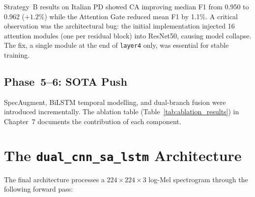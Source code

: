 \documentclass[oneside,openany]{final_report}
\begin{document}
Strategy~B results on Italian PD showed CA improving median F1 from 0.950 to 0.962 ($+1.2\%$) while the Attention Gate reduced mean F1 by 1.1\%. A critical observation was the architectural bug: the initial implementation injected 16 attention modules (one per residual block) into ResNet50, causing model collapse. The fix, a single module at the end of \texttt{layer4} only, was essential for stable training.

\subsection{Phase~5--6: SOTA Push}

SpecAugment, BiLSTM temporal modelling, and dual-branch fusion were introduced incrementally. The ablation table (Table~\ref{tab:ablation_results}) in Chapter~7 documents the contribution of each component.

\section{The \texttt{dual\_cnn\_sa\_lstm} Architecture}

The final architecture processes a $224 \times 224 \times 3$ log-Mel spectrogram through the following forward pass:
\end{document}
